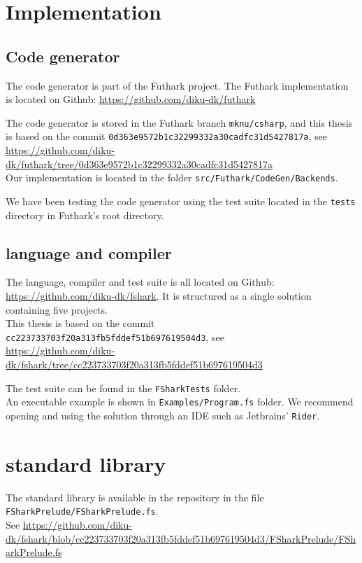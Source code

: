 \begin{appendices}
\chapter{Implementation}
\section{Code generator}
The \csharp{} code generator is part of the Futhark project.
The Futhark implementation is located on Github:
\url{https://github.com/diku-dk/futhark}

The code generator is stored in the Futhark branch \texttt{mknu/csharp}, and
this thesis is based
on the commit \texttt{0d363e9572b1c32299332a30cadfc31d5427817a}, see\\
{\scriptsize \url{https://github.com/diku-dk/futhark/tree/0d363e9572b1c32299332a30cadfc31d5427817a}}\\
Our implementation is located in the folder
\texttt{src/Futhark/CodeGen/Backends}.

We have been testing the code generator using the test suite located in the 
\texttt{tests} directory in Futhark's root directory.

\section{\fshark{} language and compiler}
The \fshark{} language, compiler and test suite is all located on Github:\\
\url{https://github.com/diku-dk/fshark}. It is structured as a single \fsharp{}
solution containing five \fsharp{} projects.\\
This thesis is based on the commit \texttt{cc223733703f20a313fb5fddef51b697619504d3}, see\\
{\scriptsize \url{https://github.com/diku-dk/fshark/tree/cc223733703f20a313fb5fddef51b697619504d3}}

The \fshark{} test suite can be found in the \texttt{FSharkTests} folder.\\
An executable example is shown in \texttt{Examples/Program.fs} folder.
We recommend opening and using the \fshark{} solution through an IDE such as
Jetbrains' \texttt{Rider}.

\chapter{\fshark{} standard library}
\label{appendix:soacs}
The \fshark{} standard library is available in the \fshark{} repository in the
file \texttt{FSharkPrelude/FSharkPrelude.fs}.\\
See {\scriptsize\url{https://github.com/diku-dk/fshark/blob/cc223733703f20a313fb5fddef51b697619504d3/FSharkPrelude/FSharkPrelude.fs}}


\end{appendices}
